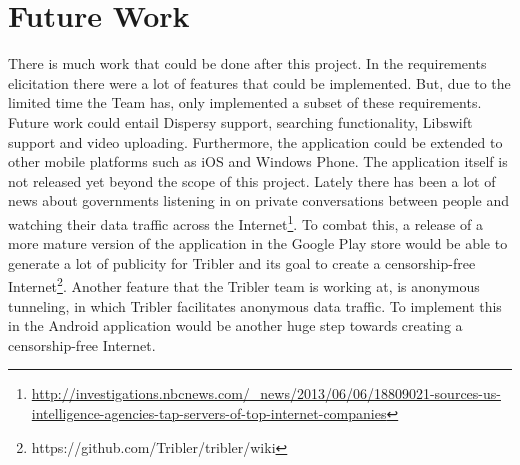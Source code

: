 \section{Future Work}
\thispagestyle{fancy}
There is much work that could be done after this project. In the requirements elicitation there were a lot of features that could be implemented. But, due to the limited time the Team has, only implemented a subset of these requirements. Future work could entail Dispersy support, searching functionality, Libswift support and video uploading. Furthermore, the application could be extended to other mobile platforms such as iOS and Windows Phone. The application itself is not released yet beyond the scope of this project. Lately there has been a lot of news about governments listening in on private conversations between people and watching their data traffic across the Internet\footnote{\url{http://investigations.nbcnews.com/\_news/2013/06/06/18809021-sources-us-intelligence-agencies-tap-servers-of-top-internet-companies}}. To combat this, a release of a more mature version of the application in the Google Play store would be able to generate a lot of publicity for Tribler and its goal to create a censorship-free Internet\footnote{https://github.com/Tribler/tribler/wiki}. Another feature that the Tribler team is working at, is anonymous tunneling, in which Tribler facilitates anonymous data traffic. To implement this in the Android application would be another huge step towards creating a censorship-free Internet.